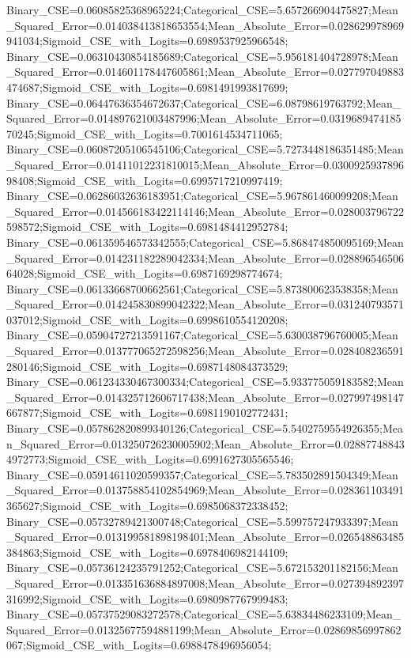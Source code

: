 Binary_CSE=0.06085825368965224;Categorical_CSE=5.657266904475827;Mean_Squared_Error=0.014038413818653554;Mean_Absolute_Error=0.028629978969941034;Sigmoid_CSE_with_Logits=0.6989537925966548;
Binary_CSE=0.06310430854185689;Categorical_CSE=5.956181404728978;Mean_Squared_Error=0.014601178447605861;Mean_Absolute_Error=0.027797049883474687;Sigmoid_CSE_with_Logits=0.6981491993817699;
Binary_CSE=0.06447636354672637;Categorical_CSE=6.08798619763792;Mean_Squared_Error=0.014897621003487996;Mean_Absolute_Error=0.031968947418570245;Sigmoid_CSE_with_Logits=0.7001614534711065;
Binary_CSE=0.06087205106545106;Categorical_CSE=5.7273448186351485;Mean_Squared_Error=0.01411012231810015;Mean_Absolute_Error=0.030092593789698408;Sigmoid_CSE_with_Logits=0.6995717210997419;
Binary_CSE=0.06286032636183951;Categorical_CSE=5.967861460099208;Mean_Squared_Error=0.014566183422114146;Mean_Absolute_Error=0.028003796722598572;Sigmoid_CSE_with_Logits=0.6981484412952784;
Binary_CSE=0.061359546573342555;Categorical_CSE=5.868474850095169;Mean_Squared_Error=0.014231182289042334;Mean_Absolute_Error=0.02889654650664028;Sigmoid_CSE_with_Logits=0.6987169298774674;
Binary_CSE=0.06133668700662561;Categorical_CSE=5.873800623538358;Mean_Squared_Error=0.014245830899042322;Mean_Absolute_Error=0.031240793571037012;Sigmoid_CSE_with_Logits=0.6998610554120208;
Binary_CSE=0.05904727213591167;Categorical_CSE=5.630038796760005;Mean_Squared_Error=0.013777065272598256;Mean_Absolute_Error=0.028408236591280146;Sigmoid_CSE_with_Logits=0.6987148084373529;
Binary_CSE=0.061234330467300334;Categorical_CSE=5.933775059183582;Mean_Squared_Error=0.014325712606717438;Mean_Absolute_Error=0.027997498147667877;Sigmoid_CSE_with_Logits=0.6981190102772431;
Binary_CSE=0.057862820899340126;Categorical_CSE=5.5402759554926355;Mean_Squared_Error=0.013250726230005902;Mean_Absolute_Error=0.028877488434972773;Sigmoid_CSE_with_Logits=0.6991627305565546;
Binary_CSE=0.05914611020599357;Categorical_CSE=5.783502891504349;Mean_Squared_Error=0.013758854102854969;Mean_Absolute_Error=0.028361103491365627;Sigmoid_CSE_with_Logits=0.6985068372338452;
Binary_CSE=0.05732789421300748;Categorical_CSE=5.599757247933397;Mean_Squared_Error=0.013199581898198401;Mean_Absolute_Error=0.026548863485384863;Sigmoid_CSE_with_Logits=0.6978406982144109;
Binary_CSE=0.05736124235791252;Categorical_CSE=5.672153201182156;Mean_Squared_Error=0.013351636884897008;Mean_Absolute_Error=0.027394892397316992;Sigmoid_CSE_with_Logits=0.6980987767999483;
Binary_CSE=0.05737529083272578;Categorical_CSE=5.63834486233109;Mean_Squared_Error=0.01325677594881199;Mean_Absolute_Error=0.02869856997862067;Sigmoid_CSE_with_Logits=0.6988478496956054;
